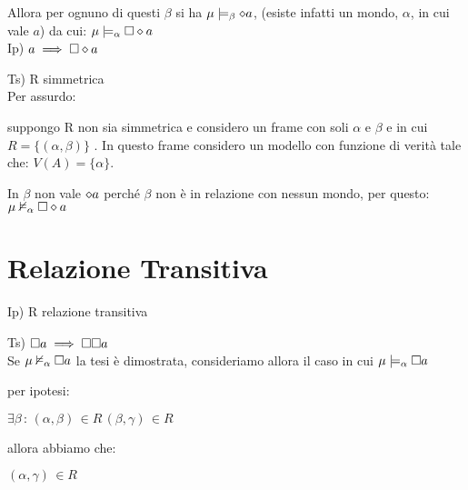 Allora per ognuno di questi $\beta$ si ha $\mu\models_{\beta}\diamond a$,
(esiste infatti un mondo, $\alpha$, in cui vale $a$) da cui: $\mu\models_{\alpha}\square\diamond a$
\\


Ip) $a\implies\square\diamond a$

Ts) R simmetrica\\


Per assurdo:

suppongo R non sia simmetrica e considero un frame con soli $\alpha$
e $\beta$ e in cui $R=\{(\alpha,\beta)\}$ . In questo frame considero
un modello con funzione di verità tale che: $V(A)=\{\alpha\}$.

In $\beta$ non vale $\diamond a$ perché $\beta$ non è in relazione con
nessun mondo, per questo: $\mu\nvDash_{\alpha}\square\diamond a$

\begin{center}
\begin{center}   \end{center}
\par\end{center}




\section{Relazione Transitiva}

Ip) R relazione transitiva

Ts) $\square a\implies\square\square a$\\


Se $\mu\nvDash_{\alpha}\square a$ la tesi è dimostrata, consideriamo
allora il caso in cui $\mu\models_{\alpha}\square a$

per ipotesi:

$\exists\beta\,:\,(\alpha,\beta)\,\in R\,(\beta,\gamma)\,\in R$

allora abbiamo che:

$(\alpha,\gamma)\,\in R$

